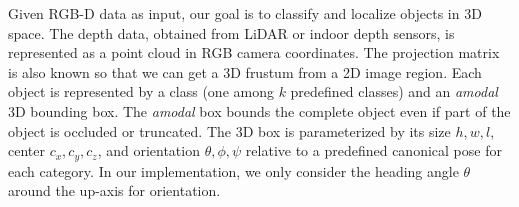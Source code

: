 \label{sec:problem_definition}
Given RGB-D data as input, our goal is to classify and localize objects in 3D space. The depth data, obtained from LiDAR or indoor depth sensors, is represented as a point cloud in RGB camera coordinates. The projection matrix is also known so that we can get a 3D frustum from a 2D image region. Each object is represented by a class (one among $k$ predefined classes) and an \emph{amodal} 3D bounding box. The \emph{amodal} box bounds the complete object even if part of the object is occluded or truncated. The 3D box is parameterized by its size $h,w,l$, center $c_x, c_y, c_z$, and orientation $\theta, \phi, \psi$ relative to a predefined canonical pose for each category. In our implementation, we only consider the heading angle $\theta$ around the up-axis for orientation.